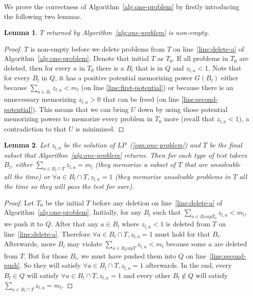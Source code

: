\documentclass{article}
\newtheorem{lemma}{Lemma}
\begin{document}
We prove the correctness of Algorithm~\ref{alg:one-problem} by firstly introducing the
following two lemmas.

\begin{lemma}\label{lemma:non-empty}
$T$ returned by Algorithm~\ref{alg:one-problem} is non-empty.
\end{lemma}
\begin{proof}
$T$ is non-empty before we delete problems from $T$ on line~\ref{line:delete-a}
of Algorithm~\ref{alg:one-problem}.  Denote that initial $T$ as $T_0$.  If all
problems in $T_0$ are deleted, then for every $a$ in $T_0$ there is a $B_l$
that is in $Q$ and $z_{l,a} < 1$.  Note that for every $B_l$ in $Q$, it has a
positive potential memorizing power $G(B_l)$ either because $\sum_{a \in B_l}
z_{l,a} < m_l$ (on line \ref{line:first-potential}) or because there is an
unnecessary memorizing $z_{l, a} > 0$ that can be freed (on line
\ref{line:second-potential}). This means that we can bring $U$ down by using
those potential memorizing powers to memorize every problem in $T_0$ more
(recall that $z_{l,a} < 1$), a contradiction to that $U$ is minimized.
\end{proof}

\begin{lemma}\label{lemma:best-response}
Let $z_{l,a}$ be the solution of LP~(\ref{eqn:one-problem}) and $T$ be the final
subset that Algorithm~\ref{alg:one-problem} returns. Then for each type of test
takers $B_l$, either $\sum_{a \in B_l \cap T} z_{l,a} = m_l$ (they memorize a
subset of $T$ that are unsolvable all the time) or $\forall a \in B_l \cap T,
z_{l, a} = 1$ (they memorize unsolvable problems in $T$ all the time so they
will pass the test for sure).
\end{lemma}
\begin{proof}
Let $T_0$ be the initial $T$ before any deletion on line~\ref{line:delete-a} of
Algorithm~\ref{alg:one-problem}.  Initially, for any $B_l$ such that $\sum_{a
\in B_l cap T_0} z_{l,a} < m_l$, we push it to $Q$. After that any $a \in B_l$
where $z_{l,a} < 1$ is deleted from $T$ on line~\ref{line:delete-a}. Therefore
$\forall a \in B_l \cap T, z_{l,a} = 1$ must hold for that $B_l$. Afterwards,
more $B_l$ may violate $\sum_{a \in B_l cap T} z_{l,a} < m_l$ because some $a$
are deleted from $T$.  But for those $B_l$, we must have pushed them into $Q$
on line~\ref{line:second-push}. So they will satisfy $\forall a \in B_l \cap T,
z_{l,a} = 1$ afterwards. In the end, every $B_l \in Q$ will satisfy $\forall a
\in B_l \cap T, z_{l,a} = 1$ and every other $B_l \notin Q$ will satisfy
$\sum_{a \in B_l \cap T} z_{l,a} = m_l$.
\end{proof}
\end{document}
